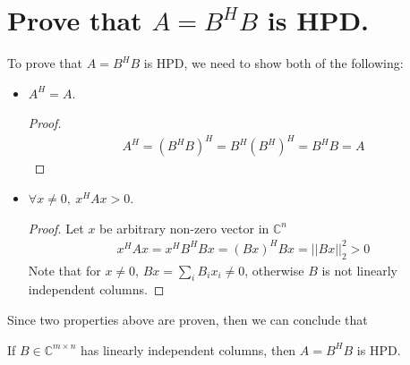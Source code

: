\documentclass[11pt,a4paper]{article}
\begin{document}
\begin{titlepage}
    \maketitle
\end{titlepage}
\begin{center} 
    \tableofcontents  
%
\end{center}
\newpage
\setcounter{section}{2}
\section{Prove that $A = B^H B$ is HPD.}
To prove that $A = B^H B$ is HPD, we need to show both of the following:
\begin{itemize}
    \item $A^H = A$.
\begin{proof}
    \begin{align}
        A^H = (B^H B)^H = B^H (B^H)^H = B^H B = A
    \end{align}
\end{proof}
    \item $\forall x \not = 0,\ x^H A x > 0$.
\begin{proof}
    Let $x$ be arbitrary non-zero vector in $\mathbb{C}^n$
    \begin{align}
        x^H A x = x^H B^H B x = (Bx)^H Bx = || Bx ||_2^2 > 0
    \end{align}
    Note that for $x \not = 0$, $Bx = \sum_i B_i x_i \not = 0$, otherwise 
    $B$ is not linearly independent columns. 
\end{proof}
\end{itemize}
Since two properties above are proven, then we can conclude that 
\begin{center}
    If $B\in\mathbb{C}^{m\times n}$ has linearly independent columns, then $A
    = B^H B$ is HPD.
\end{center}
\end{document}
